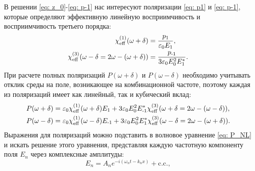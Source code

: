 В решении \eqref{eq: z_0}-\eqref{eq: p-1} нас интересуют поляризации \eqref{eq: p1} и \eqref{eq: p-1}, которые определяют эффективную линейную восприимчивость и восприимчивость третьего порядка:
\begin{equation}
\begin{aligned}
\chi^{(1)}_{\text{eff}}(\omega+\delta) &=  \frac{p_1}{\varepsilon_0 E_1}, \\
\chi^{(3)}_{\text{eff}}(\omega-\delta = 2\omega-(\omega+\delta)) &=  \frac{p_{\operatorname{-1}}}{3\varepsilon_0 E^2_0 E_1^*}.
\label{eq: P_eff}
\end{aligned}
\end{equation}
При расчете полных поляризаций $P(\omega+\delta)$ и $P(\omega-\delta)$ необходимо учитывать отклик среды на поле, возникающее на комбинационной частоте, поэтому каждая из поляризаций имеет как линейный, так и кубический вклад:
\begin{equation}
\begin{aligned}
P(\omega+\delta) &=  \varepsilon_0 \chi^{(1)}_{\text{eff}}(\omega+\delta) E_1 +  3\varepsilon_0 E^2_0 E_{\operatorname{-1}}^*\chi^{(3)}_{\text{eff}}(\omega+\delta = 2\omega-(\omega-\delta)), \\
P(\omega-\delta) &=  \varepsilon_0 \chi^{(1)}_{\text{eff}}(\omega-\delta) E_{\operatorname{-1}} +  3\varepsilon_0 E^2_0 E_1^*\chi^{(3)}_{\text{eff}}(\omega-\delta = 2\omega-(\omega+\delta)).
\label{eq: P_total}
\end{aligned}
\end{equation}
Выражения для поляризаций можно подставить в волновое уравнение \eqref{eq: P_NL} и искать решение этого уравнения, представляя каждую частотную компоненту поля $E_n$ через комплексные амплитуды:
\begin{equation}
E_n = A_n e^{-i(\omega_nt - k_nx)} + \text{c.c.},
\label{eq: E_complex}
\end{equation}
